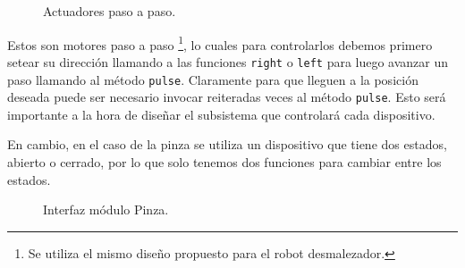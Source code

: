 \begin{figure}[h]
\label{estructuraActuadores}
\caption{Actuadores paso a paso.}
\begin{center}
\end{center}
\end{figure}

Estos son motores paso a paso \footnote{Se utiliza el mismo diseño propuesto para el robot desmalezador\cite{paperPomponio}.}, lo cuales para controlarlos debemos primero setear su dirección llamando a las funciones \verb|right| o \verb|left| para luego avanzar un paso llamando al método \verb|pulse|. Claramente para que lleguen a la posición deseada puede ser necesario invocar reiteradas veces al método \verb|pulse|. Esto será importante a la hora de diseñar el subsistema que controlará cada dispositivo.

En cambio, en el caso de la pinza se utiliza un dispositivo que tiene dos estados, abierto o cerrado, por lo que solo tenemos dos funciones para cambiar entre los estados.

\begin{figure}[h]
\caption{Interfaz módulo Pinza.}
\begin{center}
\end{center}
\end{figure}

